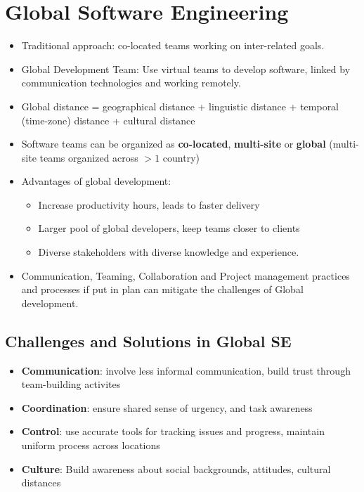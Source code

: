 \documentclass{article}
\begin{document}
\section{Global Software Engineering}
\begin{itemize}
    \item Traditional approach: co-located teams working on inter-related goals. 
    
    \item Global Development Team: Use virtual teams to develop software, linked by communication technologies and working remotely. 
    
    \item Global distance = geographical distance + linguistic distance + temporal (time-zone) distance + cultural distance
    
    \item Software teams can be organized as \textbf{co-located}, \textbf{multi-site} or \textbf{global} (multi-site teams organized across $>1$ country)
    
    \item Advantages of global development:
    \begin{itemize}
        \item Increase productivity hours, leads to faster delivery
        
        \item Larger pool of global developers, keep teams closer to clients 
        
        \item Diverse stakeholders with diverse knowledge and experience. 
    \end{itemize}
    \item Communication, Teaming, Collaboration and Project management practices and processes if put in plan can mitigate the challenges of Global development. 
\end{itemize}
\subsection{Challenges and Solutions in Global SE}
\begin{itemize}
    \item \textbf{Communication}: involve less informal communication, build trust through team-building activites
    
    \item \textbf{Coordination}: ensure shared sense of urgency, and task awareness
    
    \item \textbf{Control}: use accurate tools for tracking issues and progress, maintain uniform process across locations
    
    \item \textbf{Culture}: Build awareness about social backgrounds, attitudes, cultural distances
\end{itemize}
\end{document}

